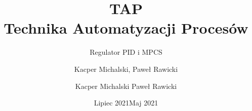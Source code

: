 \documentclass{article}
\title{\textbf{TAP} \\ Technika Automatyzacji Procesów}
\subtitle{Regulator PID i MPCS}
\author{Kacper Michalski, Paweł Rawicki }
\date{Lipiec 2021}
\author{Kacper Michalski Paweł Rawicki }
\date{Maj 2021}
\begin{document}
\maketitle


\newpage 
\tableofcontents

\newpage

\newpage{}

\newpage

\newpage

\newpage

\newpage

\newpage

\end{document}
